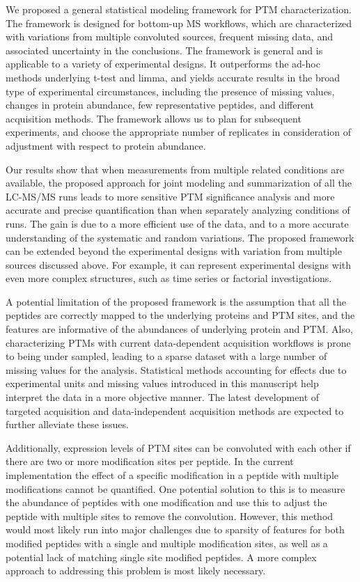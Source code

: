 \documentclass[mcp]{article}
\numberwithin{figure}{section} %
\numberwithin{table}{section}
\begin{document}
We proposed a general statistical modeling framework for PTM characterization. The framework is designed for bottom-up MS workflows, which are characterized with variations from multiple convoluted sources, frequent missing data, and associated uncertainty in the conclusions. The framework is general and is applicable to a variety of experimental designs. It outperforms the ad-hoc methods underlying t-test and limma, and yields accurate results in the broad type of experimental circumstances, including the presence of missing values, changes in protein abundance, few representative peptides, and different acquisition methods. The framework allows us to plan for subsequent experiments, and choose the appropriate number of replicates in consideration of adjustment with respect to protein abundance. 

Our results show that when measurements from multiple related conditions are available, the proposed approach for joint modeling and summarization of all the LC-MS/MS runs leads to more sensitive PTM significance analysis and more accurate and precise quantification than when separately analyzing conditions of runs. The gain is due to a more efficient use of the data, and to a more accurate understanding of the systematic and random variations. The proposed framework can be extended beyond the experimental designs with variation from multiple sources discussed above. For example, it can represent experimental designs with even more complex structures, such as time series or factorial investigations. 

A potential limitation of the proposed framework is the assumption that all the peptides are correctly mapped to the underlying proteins and PTM sites, and the features are informative of the abundances of underlying protein and PTM. Also, characterizing PTMs with current data-dependent acquisition workflows is prone to being under sampled, leading to a sparse dataset with a large number of missing values for the analysis. Statistical methods accounting for effects due to experimental units and missing values introduced in this manuscript help interpret the data in a more objective manner. The latest development of targeted acquisition and data-independent acquisition methods are expected to further alleviate these issues. 

Additionally, expression levels of PTM sites can be convoluted with each other if there are two or more modification sites per peptide. In the current implementation the effect of a specific modification in a peptide with multiple modifications cannot be quantified. One potential solution to this is to measure the abundance of peptides with one modification and use this to adjust the peptide with multiple sites to remove the convolution. However, this method would most likely run into major challenges due to sparsity of features for both modified peptides with a single and multiple modification sites, as well as a potential lack of matching single site modified peptides. A more complex approach to addressing this problem is most likely necessary.
\end{document}
